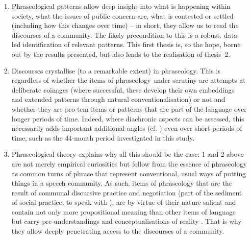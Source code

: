 \documentclass[output=paper]{langscibook}
\begin{document}
\begin{enumerate}
\item Phraseological patterns allow deep insight into what is happening within society, what the issues of public concern are, what is contested or settled (including how this changes over time) -- in short, they allow us to read the discourses of a community. The likely precondition to this is a robust, data-led identification of relevant patterns. This first thesis is, so the hope, borne out by the results presented, but also leads to the realisation of thesis~2.
\item Discourses crystallise (to a remarkable extent) in phraseology. This is regardless of whether the items of phraseology under scrutiny are attempts at deliberate coinages (where successful, these develop their own embeddings and extended patterns through natural conventionalisation) or not and whether they are pro-tem items or patterns that are part of the language over longer periods of time. Indeed, where diachronic aspects can be assessed, this necessarily adds important additional angles (cf. \citealt{Mair2019}) even over short periods of time, such as the 44-month period investigated in this study.
\item Phraseological theory explains why all this should be the case: 1 and 2 above are not merely empirical curiosities but follow from the essence of phraseology as common turns of phrase that represent conventional, usual ways of putting things in a speech community. As such, items of phraseology that are the result of communal discursive practice and negotiation (part of the sediment of social practice, to speak with \citealt{Bourdieu1977}), are by virtue of their nature salient and contain not only more propositional meaning than other items of language but carry pre-understandings and conceptualisations of reality \citep{Feilke1994,Lakoff2010}. That is why they allow deeply penetrating access to the discourses of a community.
\end{enumerate}


{\sloppy\printbibliography[heading=subbibliography,notkeyword=this]}
\end{document}
